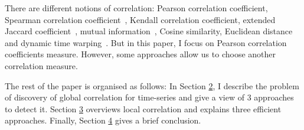 There are different notions of correlation: Pearson correlation coefficient, Spearman correlation coefficient~\cite{ref13}, Kendall correlation coefficient, extended Jaccard coefficient~\cite{ref14}, mutual information~\cite{ref10}, Cosine similarity, Euclidean distance and dynamic time warping~\cite{ref12}. But in this paper, I focus on Pearson correlation coefficients measure. However, some approaches allow us to choose another correlation measure.\newline 

The rest of the paper is organised as follows: In Section \hyperref[sec:2]{2}, I describe the problem of discovery of global correlation for time-series and give a view of 3 approaches to detect it. Section \hyperref[sec:3]{3} overviews local correlation and explains three efficient approaches. Finally, Section \hyperref[sec:4]{4} gives a brief conclusion.